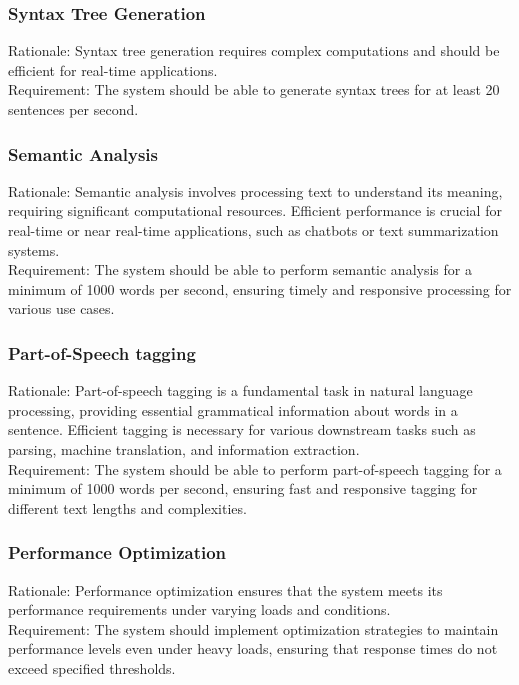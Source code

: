 \documentclass[12pt]{article}
\begin{document}
	\subsubsection{Syntax Tree Generation}
	Rationale: Syntax tree generation requires complex computations and should be efficient
	for real-time applications.\\
	Requirement: The system should be able to generate syntax trees for at least 20
	sentences per second.
	
	\subsubsection{Semantic Analysis}
	Rationale: Semantic analysis involves processing text to understand its meaning, requiring
	significant computational resources. Efficient performance is crucial for real-time or near
	real-time applications, such as chatbots or text summarization systems.\\
	Requirement: The system should be able to perform semantic analysis for a minimum of
	1000 words per second, ensuring timely and responsive processing for various use cases.
	
	\subsubsection{Part-of-Speech tagging}
	Rationale: Part-of-speech tagging is a fundamental task in natural language processing,
	providing essential grammatical information about words in a sentence. Efficient tagging is
	necessary for various downstream tasks such as parsing, machine translation, and
	information extraction.\\
	Requirement: The system should be able to perform part-of-speech tagging for a minimum
	of 1000 words per second, ensuring fast and responsive tagging for different text lengths
	and complexities.
	
	\subsubsection{Performance Optimization}
	Rationale: Performance optimization ensures that the system meets its performance
	requirements under varying loads and conditions.\\
	Requirement: The system should implement optimization strategies to maintain
	performance levels even under heavy loads, ensuring that response times do not exceed
	specified thresholds.
	
\end{document}
